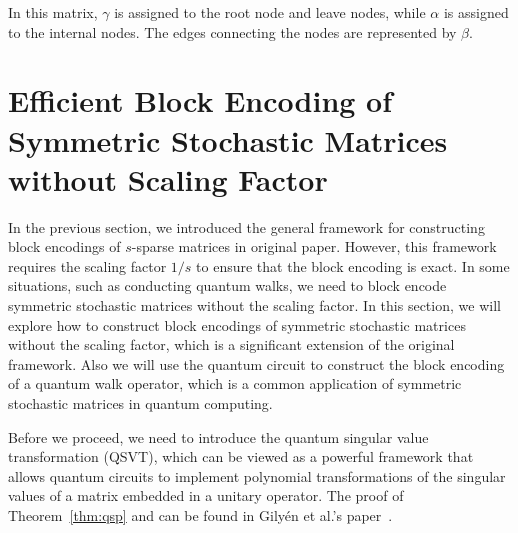 \documentclass{article}
\begin{document}
    In this matrix, $\gamma$ is assigned to the root node and leave nodes, while $\alpha$ is assigned to the internal nodes. The edges connecting the nodes are represented by $\beta$.


    \section{Efficient Block Encoding of Symmetric Stochastic Matrices without Scaling Factor}\label{sec:efficient-block-encoding-of-symmetric-stochastic-matrices-without-scaling-factor}
    In the previous section, we introduced the general framework for constructing block encodings of $s$-sparse matrices in original paper.
    However, this framework requires the scaling factor $1/s$ to ensure that the block encoding is exact.
    In some situations, such as conducting quantum walks, we need to block encode symmetric stochastic matrices without the scaling factor.
    In this section, we will explore how to construct block encodings of symmetric stochastic matrices without the scaling factor, which is a significant extension of the original framework.
    Also we will use the quantum circuit to construct the block encoding of a quantum walk operator, which is a common application of symmetric stochastic matrices in quantum computing.

    Before we proceed, we need to introduce the quantum singular value transformation (QSVT), which can be viewed as a powerful framework that allows quantum circuits to implement polynomial transformations of the singular values of a matrix embedded in a unitary operator.
    The proof of Theorem~\ref{thm:qsp} and can be found in Gilyén et al.'s paper~\cite{Gilyen2019}.
\end{document}
